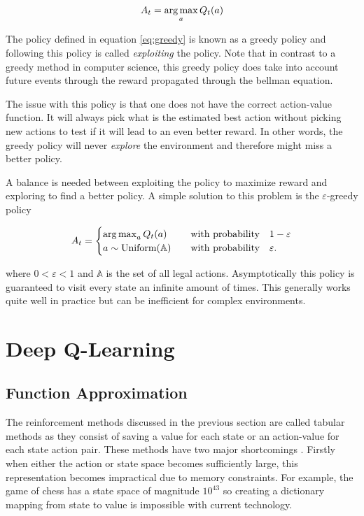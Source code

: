 \begin{equation}
    \label{eq:greedy}
    A_t = \operatorname*{arg\,max}_a Q_t(a)
\end{equation}

The policy defined in equation \ref{eq:greedy} is known as a greedy policy and following this policy is called \textit{exploiting} the policy. Note that in contrast to a greedy method in computer science, this greedy policy does take into account future events through the reward propagated through the bellman equation.

The issue with this policy is that one does not have the correct action-value function. It will always pick what is the estimated best action without picking new actions to test if it will lead to an even better reward. In other words, the greedy policy will never \textit{explore} the environment and therefore might miss a better policy.

A balance is needed between exploiting the policy to maximize reward and exploring to find a better policy. A simple solution to this problem is the $\varepsilon$-greedy policy 

\begin{equation}
    A_t = \begin{cases}
        \operatorname*{arg\,max}_a Q_t(a) &\quad \text{with probability} \quad 1-\varepsilon \\
        a \sim \text{Uniform} (\mathbb{A})  &\quad \text{with probability} \quad \varepsilon.
    \end{cases}
\end{equation}

where $0 < \varepsilon < 1$ and $\mathbb{A}$ is the set of all legal actions.
Asymptotically this policy is guaranteed to visit every state an infinite amount of times. This generally works quite well in practice but can be inefficient for complex environments. \citep[p.~27-28]{sutton_barto_2018}

\section{Deep Q-Learning}

\subsection{Function Approximation}

The reinforcement methods discussed in the previous section are called tabular methods as they consist of saving a value for each state or an action-value for each state action pair. These methods have two major shortcomings \cite[p.~195-196]{sutton_barto_2018}. Firstly when either the action or state space becomes sufficiently large, this representation becomes impractical due to memory constraints. For example, the game of chess has a state space of magnitude $10^{43}$\citep{shannon_1950} so creating a dictionary mapping from state to value is impossible with current technology. 


